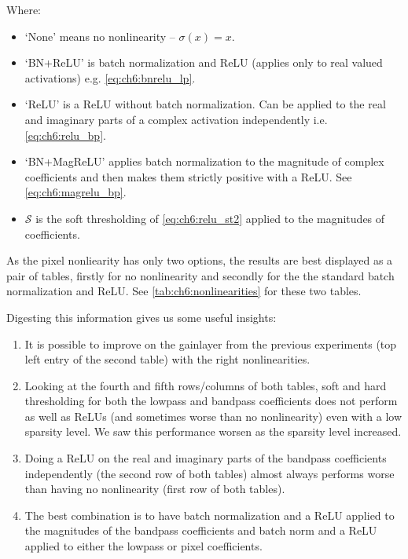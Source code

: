 Where:
\begin{itemize}
  \item `None' means no nonlinearity -- $\sigma(x) = x$.
  \item `BN+ReLU' is batch normalization and ReLU (applies only to real valued
    activations) e.g. \eqref{eq:ch6:bnrelu_lp}.
  \item `ReLU' is a ReLU without batch normalization. Can be applied to the real
    and imaginary parts of a complex activation independently i.e.
    \eqref{eq:ch6:relu_bp}.
  \item `BN+MagReLU' applies batch normalization to the magnitude of complex
    coefficients and then makes them strictly positive with a ReLU. See
    \eqref{eq:ch6:magrelu_bp}.
  \item $\mathcal{S}$ is the soft thresholding of \eqref{eq:ch6:relu_st2}
    applied to the magnitudes of coefficients. 
\end{itemize}

As the pixel nonliearity has only two options, the results are best displayed as
a pair of tables, firstly for no nonlinearity and secondly for the
the standard batch normalization and ReLU. See
\autoref{tab:ch6:nonlinearities} for these two tables. 

Digesting this information gives us some useful insights: 
\begin{enumerate}
  \item It is possible to improve on the gainlayer from the previous experiments
    (top left entry of the second table) with the right nonlinearities.
  \item Looking at the fourth and fifth rows/columns of both tables, soft and
    hard thresholding for both the lowpass and bandpass coefficients does not perform as
    well as ReLUs (and sometimes worse than no nonlinearity) even with a low
    sparsity level. We saw this performance worsen as the sparsity level
    increased.
  \item Doing a ReLU on the real and imaginary parts of the bandpass
    coefficients independently (the second row of both tables) almost always
    performs worse than having no nonlinearity (first row of both tables).
  \item The best combination is to have batch normalization and a ReLU applied
    to the magnitudes of the bandpass coefficients and batch norm and a ReLU
    applied to either the lowpass or pixel coefficients. 
\end{enumerate}

